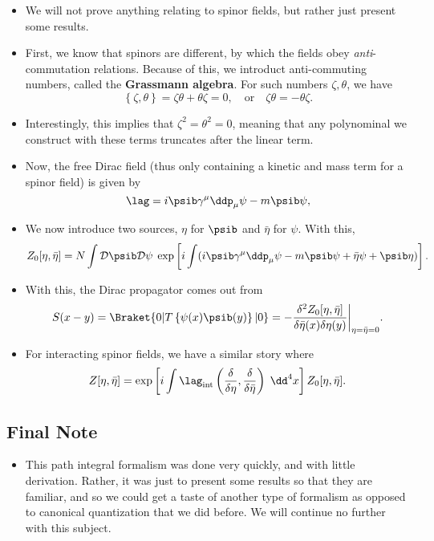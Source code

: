 \begin{itemize}
    \item We will not prove anything relating to spinor fields, but rather just present some results.
    \item First, we know that spinors are different, by which the fields obey \textit{anti}-commutation relations. Because of this, we introduct anti-commuting numbers, called the \textbf{Grassmann algebra}. For such numbers $\zeta,\theta$, we have
        \begin{equation}
            \left\{ \zeta,\theta \right\} = \zeta\theta + \theta\zeta = 0, \quad \mathrm{or} \quad \zeta\theta = -\theta\zeta.
        \end{equation}
    \item Interestingly, this implies that $\zeta^2 = \theta^2 = 0$, meaning that any polynominal we construct with these terms truncates after the linear term.
    \item Now, the free Dirac field (thus only containing a kinetic and mass term for a spinor field) is given by
        \begin{equation}
            \lag = i\psib \gamma^{\mu}\ddp_{\mu} \psi - m\psib\psi,
        \end{equation}
    \item We now introduce two sources, $\eta$ for $\psib$ and $\bar{\eta}$ for $\psi$. With this,
        \begin{equation}
            Z_0[\eta,\bar{\eta}] = N\int\mathcal{D}\psib\mathcal{D}\psi \; \exp\left[ i\int (i\psib \gamma^{\mu}\ddp_{\mu} \psi - m\psib\psi + \bar{\eta}\psi + \psib\eta) \right].
        \end{equation}
    \item With this, the Dirac propagator comes out from
        \begin{equation}
            S(x-y) = \Braket{0 | T\left\{ \psi(x)\psib(y) \right\} | 0} = -\frac{\delta^2 Z_0[\eta,\bar{\eta}]}{\delta \bar{\eta}(x) \delta \eta(y)}\bigg|_{\eta=\bar{\eta}=0}.
        \end{equation}
    \item For interacting spinor fields, we have a similar story where
        \begin{equation}
            Z[\eta,\bar{\eta}] = \exp\left[ i\int \lag_{\mathrm{int}}\left( \frac{\delta}{\delta\eta}, \frac{\delta}{\delta\bar{\eta}} \right) \;\dd^4x \right] Z_0[\eta,\bar{\eta}].
        \end{equation}
\end{itemize}


\subsection*{Final Note}

\begin{itemize}
    \item This path integral formalism was done very quickly, and with little derivation. Rather, it was just to present some results so that they are familiar, and so we could get a taste of another type of formalism as opposed to canonical quantization that we did before. We will continue no further with this subject.
\end{itemize}